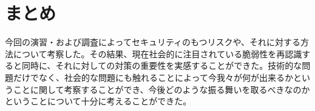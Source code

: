 \chapter{まとめ}
今回の演習・および調査によってセキュリティのもつリスクや、それに対する方法について考察した。その結果、現在社会的に注目されている脆弱性を再認識すると同時に、それに対しての対策の重要性を実感することができた。技術的な問題だけでなく、社会的な問題にも触れることによって今我々が何が出来るかということに関して考察することができ、今後どのような振る舞いを取るべきなのかということについて十分に考えることができた。

